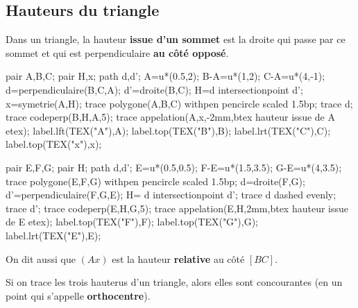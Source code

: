 \begin{changemargin}{0mm}{-15mm}
    \section{Hauteurs du triangle}
    \begin{definition}
        Dans un triangle, la hauteur \textbf{issue d'un sommet} est la droite qui passe par ce sommet et qui est perpendiculaire \textbf{au côté opposé}.
    \end{definition}
    \begin{center}
        \begin{Geometrie}[CoinHD={(6u,5u)}]
            pair A,B,C;
            pair H,x;
            path d,d';
            A=u*(0.5,2);
            B-A=u*(1,2);
            C-A=u*(4,-1);
            d=perpendiculaire(B,C,A);
            d'=droite(B,C);
            H=d intersectionpoint d';
            x=symetrie(A,H);
            trace polygone(A,B,C) withpen pencircle scaled 1.5bp;
            trace d;
            trace codeperp(B,H,A,5);
            trace appelation(A,x,-2mm,btex hauteur issue de A etex);
            label.lft(TEX("A"),A);
            label.top(TEX("B"),B);
            label.lrt(TEX("C"),C);
            label.top(TEX("x"),x);
        \end{Geometrie}
        \hspace*{0.1\linewidth}
        \begin{Geometrie}[CoinHD={(5u,5u)}]
            pair E,F,G;
            pair H;
            path d,d';
            E=u*(0.5,0.5);
            F-E=u*(1.5,3.5);
            G-E=u*(4,3.5);
            trace  polygone(E,F,G) withpen pencircle scaled 1.5bp;
            d=droite(F,G);
            d'=perpendiculaire(F,G,E);
            H= d intersectionpoint d';
            trace d dashed evenly;
            trace d';
            trace codeperp(E,H,G,5);
            trace appelation(E,H,2mm,btex hauteur issue de E etex);
            label.top(TEX("F"),F);
            label.top(TEX("G"),G);
            label.lrt(TEX("E"),E);
        \end{Geometrie}
    \end{center}
    \begin{remarque}
        On dit aussi que \textbf{$(Ax)$} est la hauteur \textbf{relative} au côté \textbf{$[BC]$}.
    \end{remarque}
    \begin{propriete}[\admise]
        Si on trace les trois hauterus d'un triangle, alors elles sont concourantes (en un point qui s'appelle \textbf{orthocentre}).
    \end{propriete}
    

\end{changemargin}
